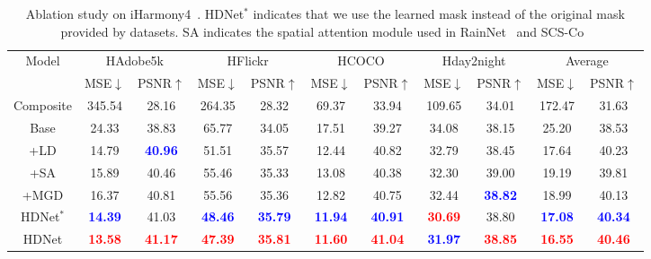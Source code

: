 \documentclass[sigconf]{acmart}
\begin{document}
\begin{table*}[t]
	\centering
	\begin{tabular}{ccccccccccc}
		\toprule
		\multirow{2}{*}{Model} & \multicolumn{2}{c}{HAdobe5k} & \multicolumn{2}{c}{HFlickr} & \multicolumn{2}{c}{HCOCO} & \multicolumn{2}{c}{Hday2night}& \multicolumn{2}{c}{Average} \\ \cline{2-3} \cline{4-11}&MSE$\downarrow$&PSNR$\uparrow$&MSE$\downarrow$&PSNR$\uparrow$&MSE$\downarrow$&PSNR$\uparrow$&MSE$\downarrow$&PSNR$\uparrow$&MSE$\downarrow$&PSNR$\uparrow$\\
		\midrule
		Composite&345.54&28.16&264.35&28.32&69.37&33.94&109.65&34.01&172.47&31.63\\
		Base
		& 24.33 &38.83 & 65.77 & 34.05 & 17.51 & 39.27 &34.08 & 38.15&25.20&38.53\\
		+LD& 14.79& \textbf{\textcolor{blue}{40.96}}& 51.51 & 35.57 & 12.44 & 40.82 & 32.79 & 38.45 & 17.64&40.23 \\
		+SA& 15.89 & 40.46 & 55.46 & 35.33 & 13.08 & 40.38 & 32.30 & 39.00 & 19.19&39.81 \\
		+MGD&16.37 &40.81 &55.56 &35.36 &12.82 & 40.75 & 32.44& \textbf{\textcolor{blue}{38.82}}&18.99&40.13 \\ 
		HDNet$^*$& \textbf{\textcolor{blue}{14.39}}&41.03 &\textbf{\textcolor{blue}{48.46}} &\textbf{\textcolor{blue}{35.79}} & \textbf{\textcolor{blue}{11.94}}&\textbf{\textcolor{blue}{40.91}} &\textbf{\textcolor{red}{30.69}}&38.80 & \textbf{\textcolor{blue}{17.08}}&\textbf{\textcolor{blue}{40.34}} \\
		
		\midrule
		HDNet&\textbf{\textcolor{red}{13.58}}&\textbf{\textcolor{red}{41.17}} & \textbf{\textcolor{red}{47.39}} & \textbf{\textcolor{red}{35.81}} & 
		\textbf{\textcolor{red}{11.60}} & \textbf{\textcolor{red}{41.04}} & \textbf{\textcolor{blue}{31.97}}& \textbf{\textcolor{red}{38.85}}& \textbf{\textcolor{red}{16.55}} & \textbf{\textcolor{red}{40.46}} \\
		\bottomrule
	\end{tabular}
	\caption{Ablation study on iHarmony4~\cite{DoveNet}. HDNet$^*$ indicates that we use the learned mask instead of the original mask provided by datasets. SA indicates the spatial attention module used in RainNet~\cite{RAIN} and SCS-Co~\cite{hang2022scs}}
\end{table*}
\end{document}
